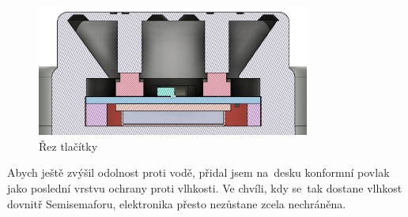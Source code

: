 \begin{figure}[!h]
  \centering
  \includegraphics[width=0.8\textwidth]{text/PraktickaCast/img/RezSemaforem.png}
  \caption{Řez tlačítky}
  \label{Semisemafor-rez-tlacitky}
\end{figure}

Abych ještě zvýšil odolnost proti vodě, přidal jsem na~desku konformní povlak jako poslední vrstvu ochrany proti vlhkosti.
Ve chvíli, kdy se~tak dostane vlhkost dovnitř Semisemaforu, elektronika přesto nezůstane zcela nechráněna.


